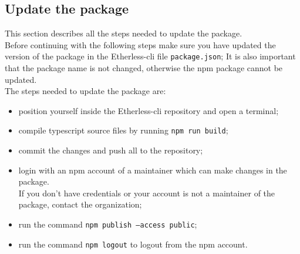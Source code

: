 \subsection{Update the package}
This section describes all the steps needed to update the package. \\
Before continuing with the following steps make sure you have updated the version of the package in the Etherless-cli file \texttt{package.json};
It is also important that the package name is not changed, otherwise the npm package cannot be updated. \\
The steps needed to update the package are:
\begin{itemize}
	\item position yourself inside the Etherless-cli repository and open a terminal;
	\item compile typescript source files by running \texttt{npm run build};
	\item commit the changes and push all to the repository;
	\item login with an npm account of a maintainer which can make changes in the package. \\
	If you don't have credentials or your account is not a maintainer of the package, contact the organization;
	\item run the command \texttt{npm publish --access public};
	\item run the command \texttt{npm logout} to logout from the npm account.
\end{itemize}
